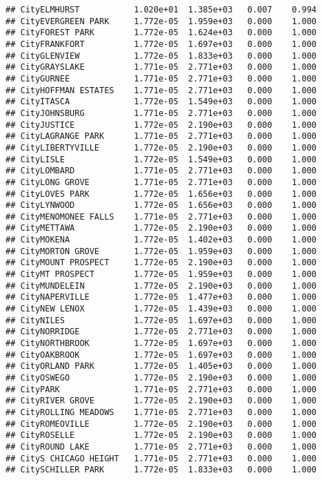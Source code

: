 \documentclass[
]{article}
\begin{document}
\begin{verbatim}
## CityELMHURST           1.020e+01  1.385e+03   0.007    0.994
## CityEVERGREEN PARK     1.772e-05  1.959e+03   0.000    1.000
## CityFOREST PARK        1.772e-05  1.624e+03   0.000    1.000
## CityFRANKFORT          1.772e-05  1.697e+03   0.000    1.000
## CityGLENVIEW           1.772e-05  1.833e+03   0.000    1.000
## CityGRAYSLAKE          1.771e-05  2.771e+03   0.000    1.000
## CityGURNEE             1.771e-05  2.771e+03   0.000    1.000
## CityHOFFMAN ESTATES    1.771e-05  2.771e+03   0.000    1.000
## CityITASCA             1.772e-05  1.549e+03   0.000    1.000
## CityJOHNSBURG          1.771e-05  2.771e+03   0.000    1.000
## CityJUSTICE            1.772e-05  2.190e+03   0.000    1.000
## CityLAGRANGE PARK      1.771e-05  2.771e+03   0.000    1.000
## CityLIBERTYVILLE       1.772e-05  2.190e+03   0.000    1.000
## CityLISLE              1.772e-05  1.549e+03   0.000    1.000
## CityLOMBARD            1.771e-05  2.771e+03   0.000    1.000
## CityLONG GROVE         1.771e-05  2.771e+03   0.000    1.000
## CityLOVES PARK         1.772e-05  1.656e+03   0.000    1.000
## CityLYNWOOD            1.772e-05  1.656e+03   0.000    1.000
## CityMENOMONEE FALLS    1.771e-05  2.771e+03   0.000    1.000
## CityMETTAWA            1.772e-05  2.190e+03   0.000    1.000
## CityMOKENA             1.772e-05  1.402e+03   0.000    1.000
## CityMORTON GROVE       1.772e-05  1.959e+03   0.000    1.000
## CityMOUNT PROSPECT     1.772e-05  2.190e+03   0.000    1.000
## CityMT PROSPECT        1.772e-05  1.959e+03   0.000    1.000
## CityMUNDELEIN          1.772e-05  2.190e+03   0.000    1.000
## CityNAPERVILLE         1.772e-05  1.477e+03   0.000    1.000
## CityNEW LENOX          1.772e-05  1.439e+03   0.000    1.000
## CityNILES              1.772e-05  1.697e+03   0.000    1.000
## CityNORRIDGE           1.772e-05  2.771e+03   0.000    1.000
## CityNORTHBROOK         1.772e-05  1.697e+03   0.000    1.000
## CityOAKBROOK           1.772e-05  1.697e+03   0.000    1.000
## CityORLAND PARK        1.772e-05  1.405e+03   0.000    1.000
## CityOSWEGO             1.772e-05  2.190e+03   0.000    1.000
## CityPARK               1.771e-05  2.771e+03   0.000    1.000
## CityRIVER GROVE        1.772e-05  2.190e+03   0.000    1.000
## CityROLLING MEADOWS    1.771e-05  2.771e+03   0.000    1.000
## CityROMEOVILLE         1.772e-05  2.190e+03   0.000    1.000
## CityROSELLE            1.772e-05  2.190e+03   0.000    1.000
## CityROUND LAKE         1.771e-05  2.771e+03   0.000    1.000
## CityS CHICAGO HEIGHT   1.771e-05  2.771e+03   0.000    1.000
## CitySCHILLER PARK      1.772e-05  1.833e+03   0.000    1.000

\end{verbatim}
\end{document}
